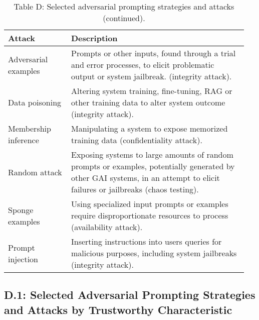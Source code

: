 \documentclass[fleqn]{article}
\begin{document}
\pagebreak
\begin{table}[H]
	\caption*{Table D: Selected adversarial prompting strategies and attacks (continued).}
	\label{tab:prompting_strategies_cont}
	\small
	\begin{tabular}{|m{0.25\linewidth}|m{0.70\linewidth}|}
		\hline
		\textbf{Attack} & \textbf{Description} \\	
		\hline
		Adversarial examples & Prompts or other inputs, found through a trial and error processes, to elicit problematic output or system jailbreak. (integrity attack). \\ \hline
		Data poisoning & Altering system training, fine-tuning, RAG or other training data to alter system outcome (integrity attack). \\ \hline
		Membership inference & Manipulating a system to expose memorized training data (confidentiality attack). \\ \hline
		Random attack & Exposing systems to large amounts of random prompts or examples, potentially generated by other GAI systems, in an attempt to elicit failures or jailbreaks (chaos testing). \\ \hline		
		Sponge examples & Using specialized input prompts or examples require disproportionate resources to process (availability attack). \\ \hline
		Prompt injection & Inserting instructions into users queries for malicious purposes, including system jailbreaks (integrity attack).  \\ \hline
	\end{tabular}
\end{table}

\pagebreak

\subsection*{D.1: Selected Adversarial Prompting Strategies and Attacks by Trustworthy Characteristic}\label{sec:appndxd1}
\end{document}
